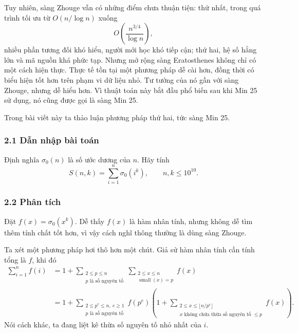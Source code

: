 \documentclass[11pt]{article}
\begin{document}
Tuy nhiên, sàng Zhouge vẫn có những điểm chưa thuận tiện: thứ nhất, trong quá
trình tối ưu từ \(O(n/\log n)\) xuống
\[
  O\left(\frac{n^{3/4}}{\log n}\right),
\]
nhiều phần tương đối khó hiểu, người mới học khó tiếp cận; thứ hai, hệ số hằng
lớn và mã nguồn khá phức tạp. Nhưng mở rộng sàng Eratosthenes không chỉ có một
cách hiện thực. Thực tế tồn tại một phương pháp dễ cài hơn, đồng thời có biểu
hiện tốt hơn trên phạm vi dữ liệu nhỏ. Tư tưởng của nó gần với sàng Zhouge,
nhưng dễ hiểu hơn. Vì thuật toán này bắt đầu phổ biến sau khi Min 25 sử dụng,
nó cũng được gọi là sàng Min 25.

Trong bài viết này ta thảo luận phương pháp thứ hai, tức sàng Min 25.

\subsubsection*{2.1 Dẫn nhập bài toán}

Định nghĩa \(\sigma_0(n)\) là số ước dương của \(n\). Hãy tính
\[
  S(n,k)=\sum_{i=1}^{n}\sigma_0(i^k),\qquad n,k\le 10^{10}.
\]

\subsubsection*{2.2 Phân tích}

Đặt \(f(x)=\sigma_0(x^k)\). Dễ thấy \(f(x)\) là hàm nhân tính, nhưng không dễ
tìm thêm tính chất tốt hơn, vì vậy cách nghĩ thông thường là dùng sàng Zhouge.

Ta xét một phương pháp hơi thô hơn một chút. Giả sử hàm nhân tính cần tính tổng
là \(f\), khi đó
\[
\begin{aligned}
  \sum_{i=1}^{n} f(i)
  &=1+\sum_{\substack{2\le p\le n\\ p\text{ là số nguyên tố}}}
      \sum_{\substack{2\le x\le n\\ \operatorname{small}(x)=p}} f(x)\\
  &=1+\sum_{\substack{2\le p^e\le n,\ e\ge 1\\ p\text{ là số nguyên tố}}}
      f(p^e)
      \left(1+
      \sum_{\substack{2\le x\le \lfloor n/p^e\rfloor\\
      x\text{ không chứa thừa số nguyên tố }\le p}} f(x)\right).
\end{aligned}
\]
Nói cách khác, ta đang liệt kê thừa số nguyên tố nhỏ nhất của \(i\).
\end{document}
